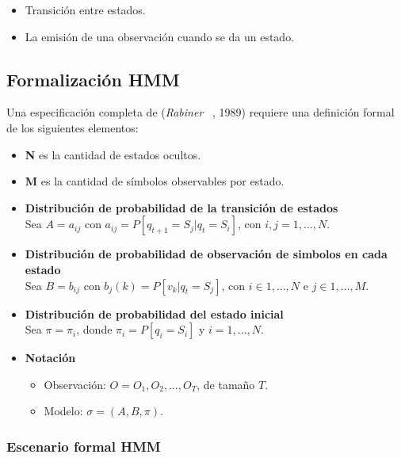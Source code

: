 \begin{itemize}
	\menorEspacioItemize
	\item Transición entre estados.
	\item La emisión de una observación cuando se da un estado.
\end{itemize}



\subsection{Formalización HMM}
Una especificación completa de \HMM (\emph{Rabiner }~\cite{Rabiner1990}, 1989) requiere una definición formal de los siguientes elementos:


\begin{itemize}
	\menorEspacioItemize
	\item \textbf{N} es la cantidad de estados ocultos.
 	\item \textbf{M} es la cantidad de símbolos observables por estado.
	\item \textbf{ Distribución de probabilidad de la transición de estados}\\
	Sea $A={a_{ij}}$ con $a_{ij} = P[q_{t+1}=S_{j} | q_t = S_i  ]$, con $i,j = 1,\dots,N$.

	\item \textbf{ Distribución de probabilidad de observación de simbolos  en cada estado} \\
	Sea $B={b_{ij}}$ con $b_{j}(k) = P[v_{k}  | q_t = S_j ]$, con $i \in {1,\dots, N}$ e $j \in {1,\dots, M}$.

	\item \textbf{ Distribución de probabilidad del estado inicial}\\
	Sea $\pi = {\pi_{i}}$, donde  $\pi_{i} = P[q_i=S_i] $ y $i=1,\dots,N$.
	\item \textbf{ Notación}
		\begin{itemize}
			\menorEspacioItemize
			\item Observación: $O = O_{1},O_{2},\dots ,O_{T}$, de tamaño $T$.
			\item Modelo: $\sigma = (A,B, \pi)$.
		\end{itemize}


\end{itemize}






\subsubsection{Escenario formal HMM}

